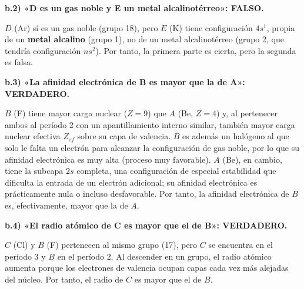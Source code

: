 \begin{exerciseEVAU}
\begin{solu}
        \textbf{b.2) «D es un gas noble y E un metal alcalinotérreo»: FALSO.}

        \(D\) (Ar) sí es un gas noble (grupo 18), pero \(E\) (K) tiene configuración \(4s^1\), propia de un \textbf{metal alcalino} (grupo 1), no de un metal alcalinotérreo (grupo 2, que tendría configuración \(ns^2\)). Por tanto, la primera parte es cierta, pero la segunda es falsa.

        \textbf{b.3) «La afinidad electrónica de B es mayor que la de A»: VERDADERO.}

        \(B\) (F) tiene mayor carga nuclear (\(Z=9\)) que \(A\) (Be, \(Z=4\)) y, al pertenecer ambos al período 2 con un apantillamiento interno similar, también mayor carga nuclear efectiva \(Z_{ef}\) sobre su capa de valencia. \(B\) es además un halógeno al que solo le falta un electrón para alcanzar la configuración de gas noble, por lo que su afinidad electrónica es muy alta (proceso muy favorable). \(A\) (Be), en cambio, tiene la subcapa \(2s\) completa, una configuración de especial estabilidad que dificulta la entrada de un electrón adicional; su afinidad electrónica es prácticamente nula o incluso desfavorable. Por tanto, la afinidad electrónica de \(B\) es, efectivamente, mayor que la de \(A\).

        \textbf{b.4) «El radio atómico de C es mayor que el de B»: VERDADERO.}

        \(C\) (Cl) y \(B\) (F) pertenecen al mismo grupo (17), pero \(C\) se encuentra en el período 3 y \(B\) en el período 2. Al descender en un grupo, el radio atómico aumenta porque los electrones de valencia ocupan capas cada vez más alejadas del núcleo. Por tanto, el radio de \(C\) es mayor que el de \(B\).

    \end{solu}
\end{exerciseEVAU}

